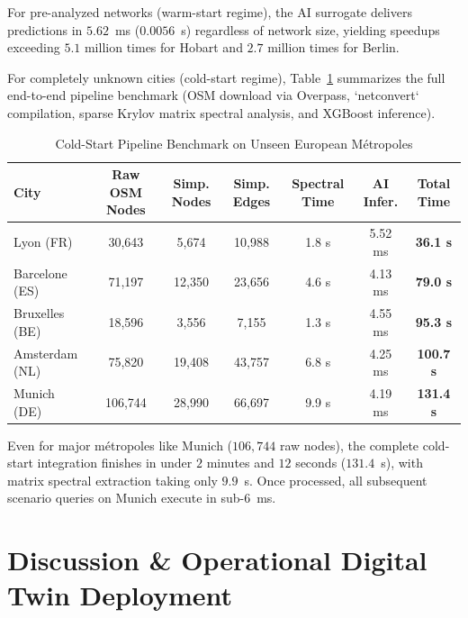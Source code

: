 \documentclass[lettersize,journal]{IEEEtran}
\begin{document}
For pre-analyzed networks (warm-start regime), the AI surrogate delivers predictions in $5.62$~ms ($0.0056$~s) regardless of network size, yielding speedups exceeding $5.1$ million times for Hobart and $2.7$ million times for Berlin. 

For completely unknown cities (cold-start regime), Table~\ref{tab:cold_start} summarizes the full end-to-end pipeline benchmark (OSM download via Overpass, `netconvert` compilation, sparse Krylov matrix spectral analysis, and XGBoost inference).

\begin{table}[htbp]
\caption{Cold-Start Pipeline Benchmark on Unseen European Métropoles}
\label{tab:cold_start}
\centering
\begin{tabular}{lcccccc}
\toprule
City & Raw OSM Nodes & Simp. Nodes & Simp. Edges & Spectral Time & AI Infer. & Total Time \\
\midrule
Lyon (FR) & 30,643 & 5,674 & 10,988 & 1.8 s & 5.52 ms & \textbf{36.1 s} \\
Barcelone (ES) & 71,197 & 12,350 & 23,656 & 4.6 s & 4.13 ms & \textbf{79.0 s} \\
Bruxelles (BE) & 18,596 & 3,556 & 7,155 & 1.3 s & 4.55 ms & \textbf{95.3 s} \\
Amsterdam (NL) & 75,820 & 19,408 & 43,757 & 6.8 s & 4.25 ms & \textbf{100.7 s} \\
Munich (DE) & 106,744 & 28,990 & 66,697 & 9.9 s & 4.19 ms & \textbf{131.4 s} \\
\bottomrule
\end{tabular}
\end{table}

Even for major métropoles like Munich ($106,744$ raw nodes), the complete cold-start integration finishes in under $2$ minutes and $12$ seconds ($131.4$~s), with matrix spectral extraction taking only $9.9$~s. Once processed, all subsequent scenario queries on Munich execute in sub-6~ms.

\section{Discussion \& Operational Digital Twin Deployment}
\end{document}

